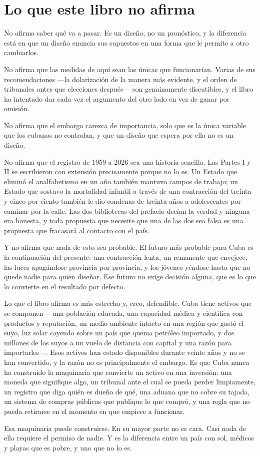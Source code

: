 \section{Lo que este libro no afirma}

No afirma saber qué va a pasar. Es un diseño, no un pronóstico, y la diferencia está en que un diseño
enuncia sus supuestos en una forma que le permite a otro cambiarlos.

No afirma que las medidas de aquí sean las únicas que funcionarían. Varias de sus recomendaciones
---la dolarización de la manera más evidente, y el orden de tribunales antes que elecciones
después--- son genuinamente discutibles, y el libro ha intentado dar cada vez el argumento del otro
lado en vez de ganar por omisión.

No afirma que el embargo carezca de importancia, solo que es la única variable que los cubanos no
controlan, y que un diseño que espera por ella no es un diseño.

No afirma que el registro de 1959 a 2026 sea una historia sencilla. Las Partes I y II se escribieron
con extensión precisamente porque no lo es. Un Estado que eliminó el analfabetismo en un año también
mantuvo campos de trabajo; un Estado que sostuvo la mortalidad infantil a través de una contracción
del treinta y cinco por ciento también le dio condenas de treinta años a adolescentes por caminar por
la calle. Las dos bibliotecas del prefacio decían la verdad y ninguna era honesta, y toda propuesta
que necesite que una de las dos sea falsa es una propuesta que fracasará al contacto con el país.

Y no afirma que nada de esto sea probable. El futuro más probable para Cuba es la continuación del
presente: una contracción lenta, un remanente que envejece, las luces apagándose provincia por
provincia, y los jóvenes yéndose hasta que no quede nadie para quien diseñar. Ese futuro no exige
decisión alguna, que es lo que lo convierte en el resultado por defecto.

Lo que el libro afirma es más estrecho y, creo, defendible. Cuba tiene activos que se componen ---una
población educada, una capacidad médica y científica con productos y reputación, un medio ambiente
intacto en una región que gastó el suyo, luz solar cayendo sobre un país que quema petróleo
importado, y dos millones de los suyos a un vuelo de distancia con capital y una razón para
importarles---. Esos activos han estado disponibles durante veinte años y no se han convertido, y la
razón no es principalmente el embargo. Es que Cuba nunca ha construido la maquinaria que convierte un
activo en una inversión: una moneda que signifique algo, un tribunal ante el cual se pueda perder
limpiamente, un registro que diga quién es dueño de qué, una aduana que no cobre su tajada, un
sistema de compras públicas que publique lo que compró, y una regla que no pueda retirarse en el
momento en que empiece a funcionar.

Esa maquinaria puede construirse. En su mayor parte no es cara. Casi nada de ella requiere el permiso
de nadie. Y es la diferencia entre un país con sol, médicos y playas que es pobre, y uno que no lo es.

